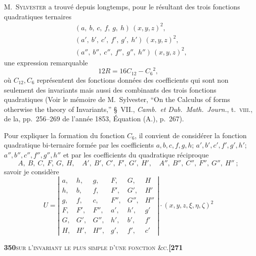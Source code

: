 \documentclass[11pt]{article}
\begin{document}
\medskip

\noindent\textsc{M.~Sylvester} a trouv\'e depuis longtemps, pour le r\'esultant des trois fonctions quadratiques ternaires
\[
\begin{aligned}
   &(a,\ b,\ c,\ f,\ g,\ h)\,(x, y, z)^2,\\
   &(a',\ b',\ c',\ f',\ g',\ h')\,(x, y, z)^2,\\
   &(a'',\ b'',\ c'',\ f'',\ g'',\ h'')\,(x, y, z)^2,
\end{aligned}
\]
une expression remarquable
\[
   12 R = 16 C_{12} - C_6{}^2,
\]
o\`u $C_{12}, C_6$ repr\'esentent des fonctions donn\'ees des coefficients qui sont non seulement des invariants mais aussi des combinants des trois fonctions quadratiques (Voir le m\'emoire de M.~Sylvester, ``On the Calculus of forms otherwise the theory of Invariants,'' \S~VII., \textit{Camb.\ et Dub.\ Math.\ Journ.}, t.~\textsc{viii}., de la, pp.~256--269 de l'ann\'ee 1853, \'Equation (A.), p.~267).

\medskip

\noindent Pour expliquer la formation du fonction $C_6$, il convient de consid\'erer la fonction quadratique bi-ternaire form\'ee par les coefficients $a, b, c, f, g, h$; $a', b', c', f', g', h'$; $a'', b'', c'', f'', g'', h''$ et par les coefficients du quadratique r\'eciproque
\[
   A,\ B,\ C,\ F,\ G,\ H,\quad A',\ B',\ C',\ F',\ G',\ H',\quad A'',\ B'',\ C'',\ F'',\ G'',\ H''\ ;
\]
savoir je consid\`ere
\[
   U = \left|\begin{array}{cccccc} a, & h, & g, & F, & G, & H\\ h, & b, & f, & F', & G', & H'\\ g, & f, & c, & F'', & G'', & H''\\ F, & F', & F'', & a', & h', & g'\\ G, & G', & G'', & h', & b', & f'\\ H, & H', & H'', & g', & f', & c'\end{array}\right|\cdot(x, y, z, \xi, \eta, \zeta)^2
\]

\newpage
\setcounter{page}{350}

\noindent\textbf{350}\hfill\textsc{sur l'invariant le plus simple d'une fonction \&c.}\hfill\textbf{[271}

\medskip
\end{document}
